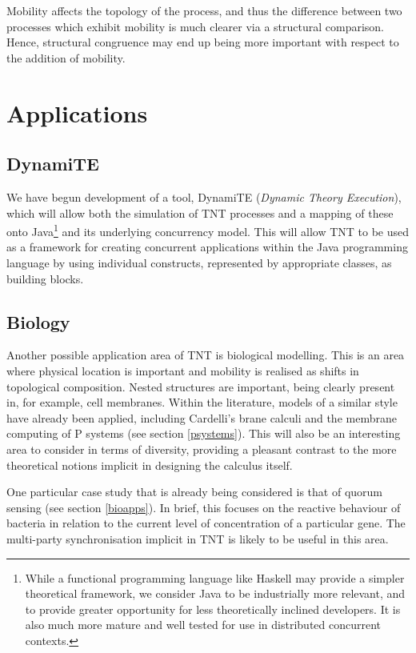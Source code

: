 Mobility affects the topology of the process, and thus the difference
between two processes which exhibit mobility is much clearer via a
structural comparison.  Hence, structural congruence may end up being
more important with respect to the addition of mobility.

\section{Applications}
\label{futureapp}

\subsection{DynamiTE}
We have begun development of a tool, DynamiTE (\emph{Dynamic Theory
Execution}), which will allow both the simulation of TNT processes and a
mapping of these onto Java\footnote{While a functional programming
language like Haskell may provide a simpler theoretical framework, we
consider Java to be industrially more relevant, and to provide greater
opportunity for less theoretically inclined developers.  It is also much
more mature and well tested for use in distributed concurrent contexts.}
and its underlying concurrency model.  This will allow TNT to be used as
a framework for creating concurrent applications within the Java
programming language by using individual constructs, represented by
appropriate classes, as building blocks.

\subsection{Biology}
Another possible application area of TNT is biological modelling.  This is an
area where physical location is important and mobility is realised as
shifts in topological composition.  Nested structures are important,
being clearly present in, for example, cell membranes.  Within the
literature, models of a similar style have already been applied,
including Cardelli's brane calculi \cite{brane04} and the membrane
computing of P systems (see section \ref{psystems}).  This will also be
an interesting area to consider in terms of diversity, providing a
pleasant contrast to the more theoretical notions implicit in
designing the calculus itself.

One particular case study that is already being considered is that of
quorum sensing (see section \ref{bioapps}).  In brief, this
focuses on the reactive behaviour of bacteria in relation to the current
level of concentration of a particular gene.  The multi-party
synchronisation implicit in TNT is likely to be useful in this area.

